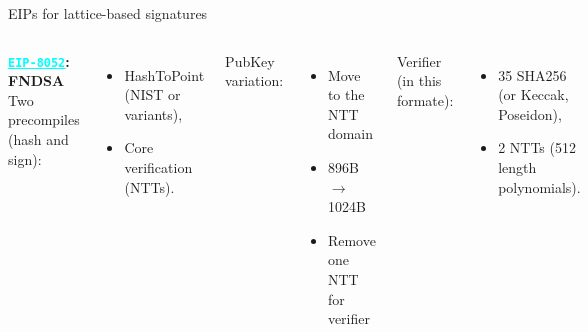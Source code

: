 \documentclass[aspectratio=1610]{beamer}
\newcommand{\link}[2]{\href{#1}{\textcolor{cyan}{\underline{\texttt{#2}}}}}
\newcommand{\eiplink}[1]{\link{https://eips.ethereum.org/EIPS/eip-#1}{EIP-#1}}
\begin{document}
\begin{frame}{EIPs for lattice-based signatures}
\begin{columns}[t]
    \textbf{\eiplink{8052}: FNDSA}\\[0.3em]
    Two precompiles (hash and sign):
    \begin{itemize}
      \item HashToPoint (NIST or variants),
      \item Core verification (NTTs).
    \end{itemize}
    PubKey variation:
    \begin{itemize}
      \item Move to the NTT domain
      \item 896B $\to$ 1024B
      \item Remove one NTT for verifier
    \end{itemize}

    \vspace{2.12cm} 

    Verifier (in this formate):
    \begin{itemize}
      \item 35 SHA256 (or Keccak, Poseidon),
      \item 2 NTTs (512 length polynomials).
    \end{itemize}
  \end{columns}
\end{frame}
\end{document}
